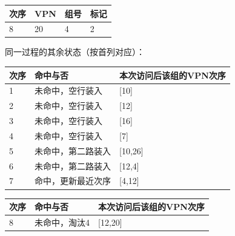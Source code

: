 \begin{wideblock}\par\medskip\noindent\begin{minipage}{\linewidth}\fontsize{9.3}{12}\selectfont\begin{tabularx}{\linewidth}{@{}YYYY@{}}
\toprule\noalign{}
次序 & VPN & 组号 & 标记 \\
\midrule\noalign{}


8 & 20 & 4 & 2 \\
\bottomrule\end{tabularx}
\end{minipage}\par\medskip\end{wideblock}

同一过程的其余状态（按首列对应）：

\par\medskip\noindent\begin{minipage}{\linewidth}\fontsize{9.3}{12}\selectfont\begin{tabularx}{\linewidth}{@{}YYY@{}}
\toprule\noalign{}
次序 & 命中与否 & 本次访问后该组的VPN次序 \\
\midrule\noalign{}


1 & 未命中，空行装入 & {[}10{]} \\
2 & 未命中，空行装入 & {[}12{]} \\
3 & 未命中，空行装入 & {[}16{]} \\
4 & 未命中，空行装入 & {[}7{]} \\
5 & 未命中，第二路装入 & {[}10,26{]} \\
6 & 未命中，第二路装入 & {[}12,4{]} \\
7 & 命中，更新最近次序 & {[}4,12{]} \\
\bottomrule\end{tabularx}
\end{minipage}\par\medskip

\par\medskip\noindent\begin{minipage}{\linewidth}\fontsize{9.3}{12}\selectfont\begin{tabularx}{\linewidth}{@{}YYY@{}}
\toprule\noalign{}
次序 & 命中与否 & 本次访问后该组的VPN次序 \\
\midrule\noalign{}


8 & 未命中，淘汰4 & {[}12,20{]} \\
\bottomrule\end{tabularx}
\end{minipage}\par\medskip

